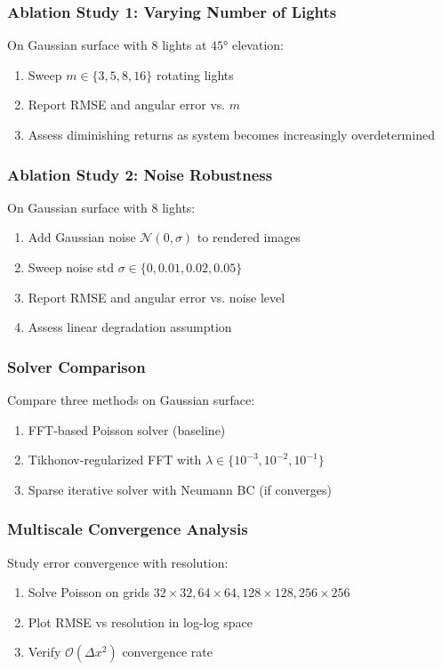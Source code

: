 \documentclass[11pt]{article}
\begin{document}
\subsubsection{Ablation Study 1: Varying Number of Lights}

On Gaussian surface with 8 lights at $45°$ elevation:
\begin{enumerate}
\item Sweep $m \in \{3, 5, 8, 16\}$ rotating lights
\item Report RMSE and angular error vs. $m$
\item Assess diminishing returns as system becomes increasingly overdetermined
\end{enumerate}

\subsubsection{Ablation Study 2: Noise Robustness}

On Gaussian surface with 8 lights:
\begin{enumerate}
\item Add Gaussian noise $\mathcal{N}(0, \sigma)$ to rendered images
\item Sweep noise std $\sigma \in \{0, 0.01, 0.02, 0.05\}$
\item Report RMSE and angular error vs. noise level
\item Assess linear degradation assumption
\end{enumerate}

\subsubsection{Solver Comparison}

Compare three methods on Gaussian surface:
\begin{enumerate}
\item FFT-based Poisson solver (baseline)
\item Tikhonov-regularized FFT with $\lambda \in \{10^{-3}, 10^{-2}, 10^{-1}\}$
\item Sparse iterative solver with Neumann BC (if converges)
\end{enumerate}

\subsubsection{Multiscale Convergence Analysis}

Study error convergence with resolution:
\begin{enumerate}
\item Solve Poisson on grids $32 \times 32, 64 \times 64, 128 \times 128, 256 \times 256$
\item Plot RMSE vs resolution in log-log space
\item Verify $\mathcal{O}(\Delta x^2)$ convergence rate
\end{enumerate}
\end{document}
